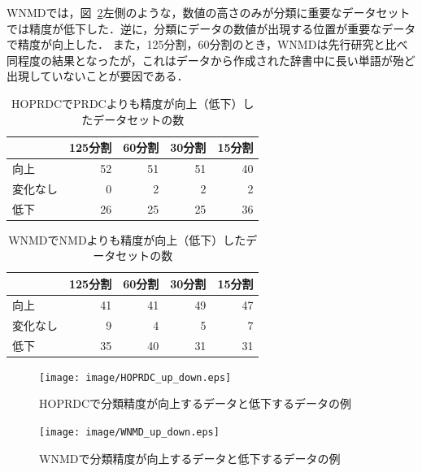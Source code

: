 WNMDでは，図~\ref{fig:image/WNMD_up_down.eps}左側のような，数値の高さのみが分類に重要なデータセットでは精度が低下した．逆に，分類にデータの数値が出現する位置が重要なデータで精度が向上した．
また，125分割，60分割のとき，WNMDは先行研究と比べ同程度の結果となったが，これはデータから作成された辞書中に長い単語が殆ど出現していないことが要因である．

\begin{table}[htbp]
\centering
\caption{HOPRDCでPRDCよりも精度が向上（低下）したデータセットの数}
\begin{tabular}{|l|r|r|r|r|}
\cline{2-5}    \multicolumn{1}{r|}{} &
\multicolumn{1}{c|}{125分割} &
\multicolumn{1}{c|}{60分割} &
\multicolumn{1}{c|}{30分割} &
\multicolumn{1}{c|}{15分割}
\bigstrut\\
\hline
向上 &
52 &
51 &
51 &
40
\bigstrut\\
\hline
変化なし &
0 &
2 &
2 &
2
\bigstrut\\
\hline
低下 &
26 &
25 &
25 &
36
\bigstrut\\
\hline
    \end{tabular}%
  \label{tab:HOPRDC_UP_AND_DOWN}%
\end{table}%

\begin{table}[htbp]
\centering
\caption{WNMDでNMDよりも精度が向上（低下）したデータセットの数}
\begin{tabular}{|l|r|r|r|r|}
\cline{2-5}    \multicolumn{1}{r|}{} &
\multicolumn{1}{c|}{125分割} &
\multicolumn{1}{c|}{60分割} &
\multicolumn{1}{c|}{30分割} &
\multicolumn{1}{c|}{15分割}
\bigstrut\\
\hline
向上 &
41 &
41 &
49 &
47
\bigstrut\\
\hline
変化なし &
9 &
4 &
5 &
7
\bigstrut\\
\hline
低下 &
35 &
40 &
31 &
31
\bigstrut\\
\hline
    \end{tabular}%
  \label{tab:WNMD_UP_AND_DOWN}%
\end{table}%


% 
\begin{figure}[tb]
\begin{center}
\texttt{[image: image/HOPRDC\_up\_down.eps]}
\caption{HOPRDCで分類精度が向上するデータと低下するデータの例}
\label{fig:image/HOPRDC_up_down.eps}
\end{center}
\end{figure}
\begin{figure}[tb]
\begin{center}
\texttt{[image: image/WNMD\_up\_down.eps]}
\caption{WNMDで分類精度が向上するデータと低下するデータの例}
\label{fig:image/WNMD_up_down.eps}
\end{center}
\end{figure}
